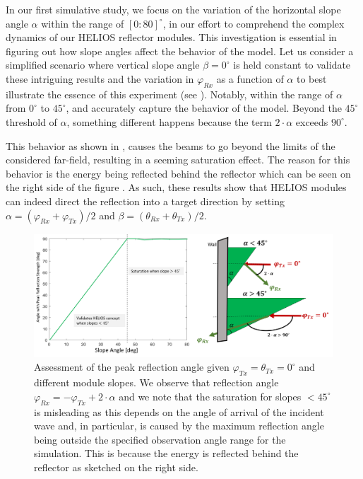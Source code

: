 In our first simulative study, we focus on the variation of the horizontal slope angle $\alpha$ within the range of $[\num{0}:\num{80}]^\circ$, in our effort to comprehend the complex dynamics of our HELIOS reflector modules. This investigation is essential in figuring out how slope angles affect the behavior of the model. Let us consider a simplified scenario where vertical slope angle $\beta=\num{0}^\circ$ is held constant to validate these intriguing results and the variation in $\varphi_{Rx}$ as a function of $\alpha$ to best illustrate the essence of this experiment (see ). Notably, within the range of $\alpha$ from $\num{0}^\circ$ to $\num{45}^\circ$,  and  accurately capture the behavior of the model. Beyond the $\num{45}^\circ$ threshold of $\alpha$, something different happens because the term $2 \cdot \alpha$ exceeds $\num{90}^\circ$.

This behavior as shown in , causes the beams to go beyond the limits of the considered far-field, resulting in a seeming saturation effect. The reason for this behavior is the energy being reflected behind the reflector which can be seen on the right side of the figure . As such, these results show that HELIOS modules can indeed direct the reflection into a target direction by setting
$\alpha = (\varphi_{Rx}+\varphi_{Tx})/2$ and $\beta = (\theta_{Rx}+\theta_{Tx})/2$.
\begin{figure}[H]
	\centering
	\includegraphics[width=0.93\linewidth]{images/Section 3 Images/Saturation}
	\caption{Assessment of the peak reflection angle given $\varphi_{Tx}=\theta_{Tx}=0^\circ$ and different module slopes. We observe that reflection angle $\varphi_{Rx} = -\varphi_{Tx} + 2\cdot \alpha$ and we note that the saturation for slopes $< \num{45}^\circ$ is misleading as this depends on the angle of arrival of the incident wave and, in particular, is caused by the maximum reflection angle being outside the specified observation angle range for the simulation. This is because the energy is reflected behind the reflector as sketched on the right side.}
	\label{fig:saturation}
\end{figure}
